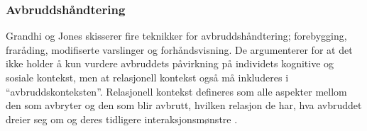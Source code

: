 \subsubsection{Avbruddshåndtering}
Grandhi og Jones skisserer fire teknikker for avbruddshåndtering; forebygging, fraråding, modifiserte varslinger og forhåndsvisning. De argumenterer for at det ikke holder å kun vurdere avbruddets påvirkning på individets kognitive og sosiale kontekst, men at relasjonell kontekst også må inkluderes i “avbruddskonteksten”. Relasjonell kontekst defineres som alle aspekter mellom den som avbryter og den som blir avbrutt, hvilken relasjon de har, hva avbruddet dreier seg om og deres tidligere interaksjonsmønstre \cite{Grandhi10}.
